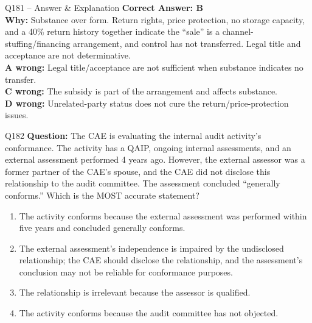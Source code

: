 \documentclass[aspectratio=169,10pt]{beamer}
\begin{document}
	\begin{frame}[t]{Q181 -- Answer \& Explanation}
		\small
		\textbf{Correct Answer: B} \\[4pt]
		\textbf{Why:} Substance over form. Return rights, price protection, no storage capacity, and a 40\% return history together indicate the ``sale'' is a channel-stuffing/financing arrangement, and control has not transferred. Legal title and acceptance are not determinative. \\[4pt]
		\textbf{A wrong:} Legal title/acceptance are not sufficient when substance indicates no transfer. \\[2pt]
		\textbf{C wrong:} The subsidy is part of the arrangement and affects substance. \\[2pt]
		\textbf{D wrong:} Unrelated-party status does not cure the return/price-protection issues.
	\end{frame}
	
	\begin{frame}[t]{Q182}
		\small
		\textbf{Question:} The CAE is evaluating the internal audit activity's conformance. The activity has a QAIP, ongoing internal assessments, and an external assessment performed 4 years ago. However, the external assessor was a former partner of the CAE's spouse, and the CAE did not disclose this relationship to the audit committee. The assessment concluded ``generally conforms.'' Which is the MOST accurate statement?
		\begin{enumerate}[label=\Alph*.,itemsep=1pt,topsep=2pt]
			\item The activity conforms because the external assessment was performed within five years and concluded generally conforms.
			\item The external assessment's independence is impaired by the undisclosed relationship; the CAE should disclose the relationship, and the assessment's conclusion may not be reliable for conformance purposes.
			\item The relationship is irrelevant because the assessor is qualified.
			\item The activity conforms because the audit committee has not objected.
		\end{enumerate}
	\end{frame}
	
\end{document}
